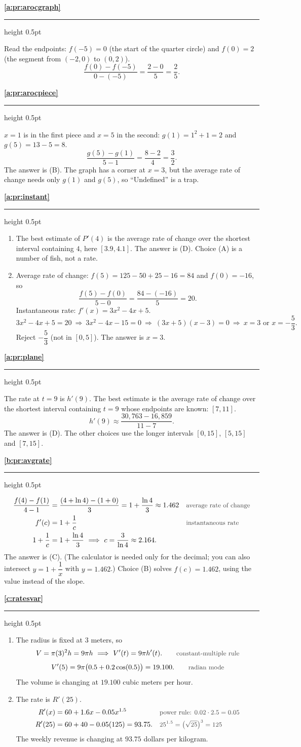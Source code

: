 \documentclass[11pt,a4paper]{article}
\newcommand{\solitem}[2]{%
 \par\addvspace{16pt}\Needspace{10\baselineskip}%
 {\large\bfseries \ref{#1}}\par\nobreak\vspace{2pt}%
 {\color{rulegray}\hrule height 0.5pt}\nobreak\vspace{7pt}%
 #2\par}
\newcommand{\why}[1]{\text{\small\color{darkgray}#1}}
\newcommand{\imp}{\ \Longrightarrow\ }
\begin{document}
\solitem{a:pr:arocgraph}{%
Read the endpoints: $f(-5)=0$ (the start of the quarter circle) and $f(0)=2$ (the segment from $(-2,0)$ to $(0,2)$).
\[
\frac{f(0)-f(-5)}{0-(-5)}=\frac{2-0}{5}=\frac25.
\]
}

\solitem{a:pr:arocpiece}{%
$x=1$ is in the first piece and $x=5$ in the second: $g(1)=1^2+1=2$ and $g(5)=13-5=8$.
\[
\frac{g(5)-g(1)}{5-1}=\frac{8-2}{4}=\frac32.
\]
The answer is (B). The graph has a corner at $x=3$, but the average rate of change needs only $g(1)$ and $g(5)$, so ``Undefined'' is a trap.
}

\solitem{a:pr:instant}{%
\begin{enumerate}[label=(\alph*)]
 \item The best estimate of $P'(4)$ is the average rate of change over the shortest interval containing $4$, here $[3.9,4.1]$. The answer is (D). Choice (A) is a number of fish, not a rate.
 \item Average rate of change: $f(5)=125-50+25-16=84$ and $f(0)=-16$, so
 \[
 \frac{f(5)-f(0)}{5-0}=\frac{84-(-16)}{5}=20.
 \]
 Instantaneous rate: $f'(x)=3x^2-4x+5$.
 \[
 3x^2-4x+5=20\imp3x^2-4x-15=0\imp(3x+5)(x-3)=0\imp x=3\text{ or }x=-\frac53.
 \]
 Reject $-\dfrac53$ (not in $[0,5]$). The answer is $x=3$.
\end{enumerate}
}

\solitem{a:pr:plane}{%
The rate at $t=9$ is $h'(9)$. The best estimate is the average rate of change over the shortest interval containing $t=9$ whose endpoints are known: $[7,11]$.
\[
h'(9)\approx\frac{30{,}763-16{,}859}{11-7}.
\]
The answer is (D). The other choices use the longer intervals $[0,15]$, $[5,15]$ and $[7,15]$.
}

\solitem{b:pr:avgrate}{%
\begin{align*}
\frac{f(4)-f(1)}{4-1}&=\frac{(4+\ln4)-(1+0)}{3}=1+\frac{\ln4}{3}\approx1.462 &&\why{average rate of change}\\
f'(c)&=1+\frac1c &&\why{instantaneous rate}\\
1+\frac1c&=1+\frac{\ln4}{3}\imp c=\frac{3}{\ln4}\approx2.164.
\end{align*}
The answer is (C). (The calculator is needed only for the decimal; you can also intersect $y=1+\dfrac1x$ with $y=1.462$.) Choice (B) solves $f(c)=1.462$, using the value instead of the slope.
}

\solitem{c:ratesvar}{%
\begin{enumerate}[label=(\alph*)]
 \item The radius is fixed at $3$ meters, so
 \[
 V=\pi(3)^2h=9\pi h\imp V'(t)=9\pi h'(t). \qquad\why{constant-multiple rule}
 \]
 \[
 V'(5)=9\pi\bigl(0.5+0.2\cos(0.5)\bigr)=19.100. \qquad\why{radian mode}
 \]
 The volume is changing at $19.100$ cubic meters per hour.
 \item The rate is $R'(25)$.
 \begin{align*}
 R'(x)&=60+1.6x-0.05x^{1.5} &&\why{power rule: $0.02\cdot2.5=0.05$}\\
 R'(25)&=60+40-0.05(125)=93.75. &&\why{$25^{1.5}=\bigl(\sqrt{25}\bigr)^3=125$}
 \end{align*}
 The weekly revenue is changing at $93.75$ dollars per kilogram.
\end{enumerate}
}
\end{document}
